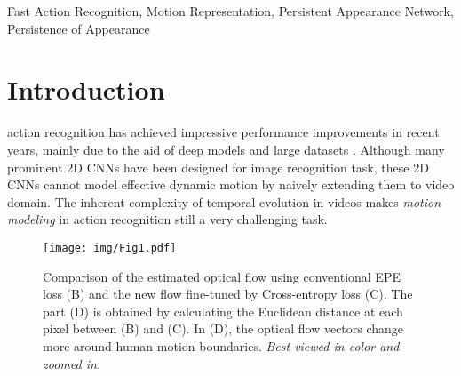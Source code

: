 \documentclass[journal]{IEEEtran}
\begin{document}
\begin{IEEEkeywords}
Fast Action Recognition, Motion Representation, Persistent Appearance Network, Persistence of Appearance
\end{IEEEkeywords}






\IEEEpeerreviewmaketitle

\section{Introduction} \label{section:intro}

 action recognition has achieved impressive performance improvements in recent years, mainly due to the aid of deep models \cite{simonyan2014two, tran2015learning,Wang_2018_CVPR} and large datasets \cite{something,kinetics,Materzynska_2019_ICCV_Workshops}. Although many prominent 2D CNNs \cite{VGG, ResNet, Inception} have been designed for image recognition task, these 2D CNNs cannot model effective dynamic motion by naively extending them to video domain. The inherent complexity of temporal evolution in videos makes \emph{motion modeling} in action recognition still a very challenging task. 




\begin{figure}[t]
\begin{center}
\texttt{[image: img/Fig1.pdf]}
\end{center}
   \caption{Comparison of the estimated optical flow using conventional EPE loss (B) and the new flow fine-tuned by Cross-entropy loss (C). The part (D) is obtained by calculating the Euclidean distance at each pixel between (B) and (C). In (D), the optical flow vectors change more around human motion boundaries.  \emph{Best viewed in color and zoomed in.}}
\label{fig:intro}
\end{figure}
\end{document}
